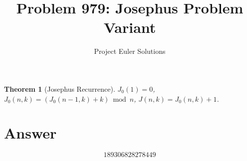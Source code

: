 \documentclass[11pt]{article}
\title{Problem 979: Josephus Problem Variant}
\author{Project Euler Solutions}
\date{}
\newtheorem{theorem}{Theorem}
\begin{document}
\maketitle
\begin{theorem}[Josephus Recurrence]
$J_0(1)=0$, $J_0(n,k)=(J_0(n-1,k)+k)\bmod n$, $J(n,k)=J_0(n,k)+1$.
\end{theorem}
\section{Answer}

\[
\boxed{189306828278449}
\]
\end{document}
